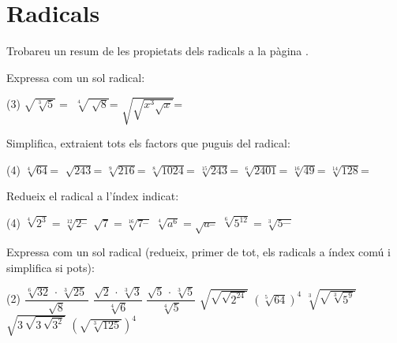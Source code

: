 \section{Radicals}

\begin{theorybox}
	Trobareu un resum de les propietats dels radicals a la pàgina \pageref{page:pradicals}.
\end{theorybox}

\begin{mylist}
	
\exer[1]  Expressa com un sol radical:
\begin{tasks}(3)
\task $\sqrt{\sqrt[{3}]{5} } =$          
\task $\sqrt[{4}]{\sqrt[{}]{8} } $=                   
\task $\sqrt{\sqrt{x^{3} \sqrt{x} } } $=
\end{tasks}

\exer[1] Simplifica, extraient tots els factors que puguis del radical:
\begin{tasks}(4)
	\task  $\sqrt[{4}]{64} $=      
	\task  $\sqrt[{}]{243} $=          
	\task  $\sqrt[{9}]{216} $=      
	\task  $\sqrt[{8}]{1024} $=
	\task  $\sqrt[{15}]{243} $=   
	\task  $\sqrt[{6}]{2401} $= 
	\task  $\sqrt[{16}]{49} $=      
	\task  $\sqrt[{14}]{128} $=
\end{tasks}

\exer[1] Redueix el radical a l'\'{i}ndex indicat:
\begin{tasks}(4)
	\task $\sqrt[{4}]{2^{3} } =\sqrt[{12}]{2^{\_ \_ } } $    
	\task $\sqrt{7} =\sqrt[{16}]{7^{\_ \_ } } $    
	\task $\sqrt[{4}]{a^{6} } =\sqrt{a^{\_ \_ } } $     
	\task $\sqrt[{6}]{5^{12} } =\sqrt[{3}]{5^{\_ \_ \_ } } $
\end{tasks}
\answers{[$\sqrt[{4}]{2^{3} } =\sqrt[{12}]{2^{9} } $,       $\sqrt{7} =\sqrt[{16}]{7^{8} } $,    $\sqrt[{4}]{a^{6} } =\sqrt{a^{3} } $,     $\sqrt[{6}]{5^{12} } =\sqrt[{3}]{5^{6} } =5^{2} $]}

\exer[1] Expressa com un sol radical (redueix, primer de tot, els radicals a \'{i}ndex com\'{u} i simplifica si pots):  
\begin{tasks}(2)
	\task $\dfrac{\sqrt[{6}]{32} \, \cdot \, \sqrt[{3}]{25} \, }{\sqrt{8} } $   
	\task $\dfrac{\sqrt{2} \, \cdot \, \sqrt[{3}]{3} }{\sqrt[{4}]{6} } $   
	\task $\dfrac{\sqrt{5} \, \cdot \, \sqrt[{3}]{5} }{\sqrt[{4}]{5} } $     
	\task $\sqrt{\sqrt{\sqrt{2^{24} } } } $
	\task $\left(\sqrt[{5}]{64} \right)^{4} $   
	\task $\sqrt[{3}]{\sqrt{\sqrt[{3}]{5^{9} } } } $   
	\task $\sqrt{3\, \sqrt{3\, \sqrt{3^{2} } } } $    
	\task $\left(\sqrt{\sqrt[{3}]{125} } \right)^{4} $
\end{tasks}


\end{mylist}
